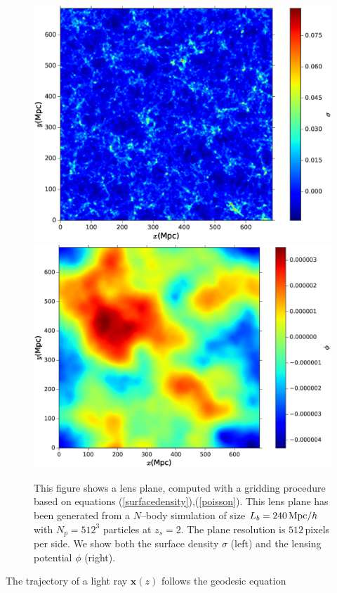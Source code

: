 \documentclass[reprint,aps,prd,superscriptaddress,showkeys,showpacs]{revtex4-1}
\newcommand{\bb}[1]{\mathbf{#1}}
\begin{document}
\begin{figure}
\includegraphics[scale=0.3]{Figures/lens_plane_density.eps}
\includegraphics[scale=0.3]{Figures/lens_plane_potential.eps}
\caption{This figure shows a lens plane, computed with a gridding procedure based on equations (\ref{surfacedensity}),(\ref{poisson}). This lens plane has been generated from a $N$--body simulation of size $L_b=240\,{\rm Mpc}/h$ with $N_p=512^3$ particles at $z_s=2$. The plane resolution is $512\,$pixels per side. We show both the surface density $\sigma$ (left) and the lensing potential $\phi$ (right).}
\label{lensplanefig}
\end{figure}
%
The trajectory of a light ray $\bb{x}(z)$ follows the geodesic equation
\end{document}
